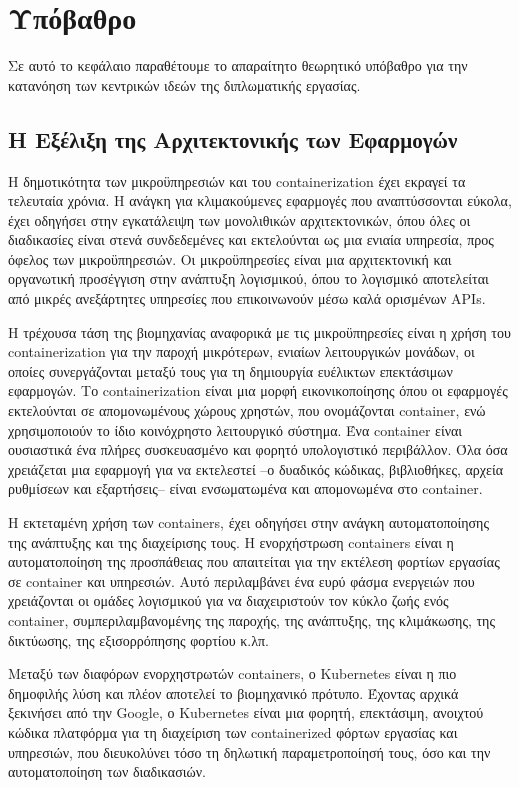 \chapter{Υπόβαθρο} \label{chapter:gr-background}

Σε αυτό το κεφάλαιο παραθέτουμε το απαραίτητο θεωρητικό υπόβαθρο για την
κατανόηση των κεντρικών ιδεών της διπλωματικής εργασίας.

\section{Η Εξέλιξη της Αρχιτεκτονικής των Εφαρμογών}

Η δημοτικότητα των μικροϋπηρεσιών και του containerization έχει εκραγεί τα
τελευταία χρόνια. Η ανάγκη για κλιμακούμενες εφαρμογές που αναπτύσσονται εύκολα,
έχει οδηγήσει στην εγκατάλειψη των μονολιθικών αρχιτεκτονικών, όπου όλες οι
διαδικασίες είναι στενά συνδεδεμένες και εκτελούνται ως μια ενιαία υπηρεσία,
προς όφελος των μικροϋπηρεσιών. Οι μικροϋπηρεσίες είναι μια αρχιτεκτονική και
οργανωτική προσέγγιση στην ανάπτυξη λογισμικού, όπου το λογισμικό αποτελείται
από μικρές ανεξάρτητες υπηρεσίες που επικοινωνούν μέσω καλά ορισμένων APIs.

Η τρέχουσα τάση της βιομηχανίας αναφορικά με τις μικροϋπηρεσίες είναι η χρήση
του containerization για την παροχή μικρότερων, ενιαίων λειτουργικών μονάδων, οι
οποίες συνεργάζονται μεταξύ τους για τη δημιουργία ευέλικτων επεκτάσιμων
εφαρμογών. Το containerization είναι μια μορφή εικονικοποίησης όπου οι εφαρμογές
εκτελούνται σε απομονωμένους χώρους χρηστών, που ονομάζονται container, ενώ
χρησιμοποιούν το ίδιο κοινόχρηστο λειτουργικό σύστημα. Ένα container είναι
ουσιαστικά ένα πλήρες συσκευασμένο και φορητό υπολογιστικό περιβάλλον. Όλα όσα
χρειάζεται μια εφαρμογή για να εκτελεστεί --ο δυαδικός κώδικας, βιβλιοθήκες,
αρχεία ρυθμίσεων και εξαρτήσεις-- είναι ενσωματωμένα και απομονωμένα στο
container.

Η εκτεταμένη χρήση των containers, έχει οδηγήσει στην ανάγκη αυτοματοποίησης της
ανάπτυξης και της διαχείρισης τους. Η ενορχήστρωση containers είναι η
αυτοματοποίηση της προσπάθειας που απαιτείται για την εκτέλεση φορτίων εργασίας
σε container και υπηρεσιών. Αυτό περιλαμβάνει ένα ευρύ φάσμα ενεργειών που
χρειάζονται οι ομάδες λογισμικού για να διαχειριστούν τον κύκλο ζωής ενός
container, συμπεριλαμβανομένης της παροχής, της ανάπτυξης, της κλιμάκωσης, της
δικτύωσης, της εξισορρόπησης φορτίου κ.λπ.

Μεταξύ των διαφόρων ενορχηστρωτών containers, ο Kubernetes είναι η πιο δημοφιλής
λύση και πλέον αποτελεί το βιομηχανικό πρότυπο. Έχοντας αρχικά ξεκινήσει από την
Google, ο Kubernetes είναι μια φορητή, επεκτάσιμη, ανοιχτού κώδικα πλατφόρμα για
τη διαχείριση των containerized φόρτων εργασίας και υπηρεσιών, που διευκολύνει
τόσο τη δηλωτική παραμετροποίησή τους, όσο και την αυτοματοποίηση των
διαδικασιών.

